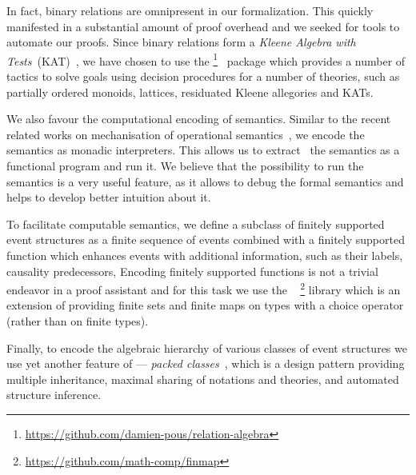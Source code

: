 In fact, binary relations are omnipresent in our formalization.
This quickly manifested in a substantial amount of proof overhead and
we seeked for tools to automate our proofs.
Since binary relations form a \emph{Kleene Algebra with Tests}~(KAT)~\cite{Kozen:TOPLAS:1997},
we have chosen to use the \relationalgebra%
\footnote{\url{https://github.com/damien-pous/relation-algebra}}~%
\cite{Pous-ITP2013} package 
which provides a number of tactics to solve goals using
decision procedures for a number of theories, such as
partially ordered monoids, lattices, residuated Kleene allegories and KATs.

We also favour the computational encoding of semantics. 
Similar to the recent related works on mechanisation 
of operational semantics~\cite{Xia-al:POPL2019, Letan-al:CPP2020, Affeldt-al:ICMPC2019}, 
we encode the semantics as monadic interpreters.  
This allows us to extract~\cite{Letouzey:CCE2008} 
the semantics as a functional program and run it. 
We believe that the possibility to run the semantics 
is a very useful feature, as it allows 
to debug the formal semantics
and helps to develop better intuition about it.

To facilitate computable semantics, we define a subclass of
finitely supported event structures as a finite sequence of events
combined with a finitely supported function which enhances events with 
additional information, such as their labels, causality predecessors, \etc 
Encoding finitely supported functions is not a trivial endeavor in
a proof assistant and for this task we use the \finmap~%
\footnote{\url{https://github.com/math-comp/finmap}}
library which is an extension of \mathcomp providing finite sets and
finite maps on types with a choice operator (rather than on finite types).

Finally, to encode the algebraic hierarchy of various classes of event structures
we use yet another feature of \mathcomp --- 
\emph{packed classes}~\cite{Garillot-al:ICTPHOL2009},
which is a design pattern providing multiple inheritance,
maximal sharing of notations and theories,
and automated structure inference. %


